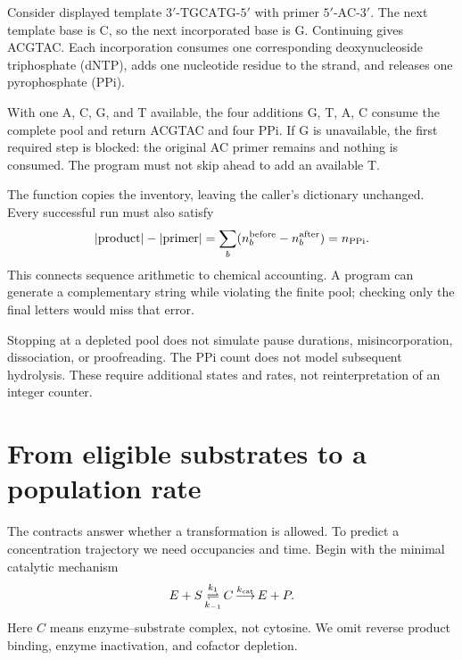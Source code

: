 Consider displayed template $3'\text{-TGCATG-}5'$ with primer $5'\text{-AC-}3'$. The next template base is C, so the next incorporated base is G. Continuing gives ACGTAC. Each incorporation consumes one corresponding deoxynucleoside triphosphate (dNTP), adds one nucleotide residue to the strand, and releases one pyrophosphate (PPi).



With one A, C, G, and T available, the four additions G, T, A, C consume the complete pool and return ACGTAC and four PPi. If G is unavailable, the first required step is blocked: the original AC primer remains and nothing is consumed. The program must not skip ahead to add an available T.

The function copies the inventory, leaving the caller's dictionary unchanged. Every successful run must also satisfy
\begin{equation}
|{\rm product}|-|{\rm primer}|
=\sum_b(n_b^{\rm before}-n_b^{\rm after})=n_{\rm PPi}.
\label{eq:extensionbalance}
\end{equation}
This connects sequence arithmetic to chemical accounting. A program can generate a complementary string while violating the finite pool; checking only the final letters would miss that error.

Stopping at a depleted pool does not simulate pause durations, misincorporation, dissociation, or proofreading. The PPi count does not model subsequent hydrolysis. These require additional states and rates, not reinterpretation of an integer counter.

\section{From eligible substrates to a population rate}

The contracts answer whether a transformation is allowed. To predict a concentration trajectory we need occupancies and time. Begin with the minimal catalytic mechanism
\begin{equation}
E+S \mathop{\rightleftharpoons}^{k_1}_{k_{-1}} C
\mathop{\longrightarrow}^{k_{\rm cat}} E+P.
\label{eq:enzyme}
\end{equation}
Here $C$ means enzyme--substrate complex, not cytosine. We omit reverse product binding, enzyme inactivation, and cofactor depletion.

